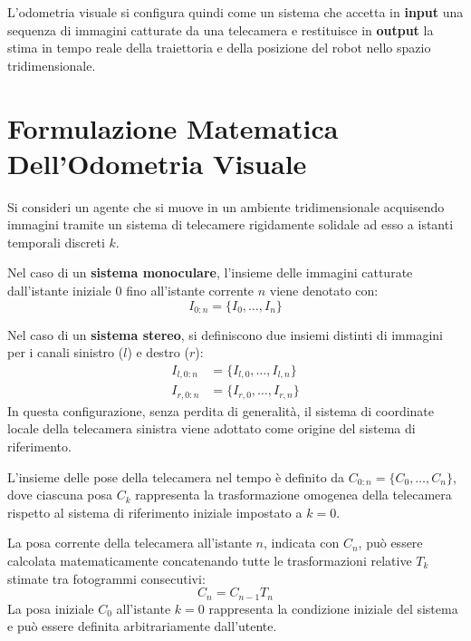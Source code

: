 ﻿\documentclass[11pt, a4paper]{article}
\begin{document}
L'odometria visuale si configura quindi come un sistema che accetta in \textbf{input} una sequenza di immagini catturate da una telecamera e restituisce in \textbf{output} la stima in tempo reale della traiettoria e della posizione del robot nello spazio tridimensionale.


\newpage

\section{Formulazione Matematica Dell'Odometria Visuale}

Si consideri un agente che si muove in un ambiente tridimensionale acquisendo immagini tramite un sistema di telecamere rigidamente solidale ad esso a istanti temporali discreti $k$.

Nel caso di un \textbf{sistema monoculare}, l'insieme delle immagini catturate dall'istante iniziale $0$ fino all'istante corrente $n$ viene denotato con:
\[ I_{0:n} = \{I_0, \dots, I_n\} \]

Nel caso di un \textbf{sistema stereo}, si definiscono due insiemi distinti di immagini per i canali sinistro ($l$) e destro ($r$):
\begin{align*}
I_{l,0:n} &= \{I_{l,0}, \dots, I_{l,n}\} \\
I_{r,0:n} &= \{I_{r,0}, \dots, I_{r,n}\}
\end{align*}
In questa configurazione, senza perdita di generalità, il sistema di coordinate locale della telecamera sinistra viene adottato come origine del sistema di riferimento.


L'insieme delle pose della telecamera nel tempo è definito da $C_{0:n} = \{C_0, \dots, C_n\}$, dove ciascuna posa $C_k$ rappresenta la trasformazione omogenea della telecamera rispetto al sistema di riferimento iniziale impostato a $k=0$.


La posa corrente della telecamera all'istante $n$, indicata con $C_n$, può essere calcolata matematicamente concatenando tutte le trasformazioni relative $T_k$ stimate tra fotogrammi consecutivi:
\[ \boxed{C_n = C_{n-1} T_n} \]
La posa iniziale $C_0$ all'istante $k=0$ rappresenta la condizione iniziale del sistema e può essere definita arbitrariamente dall'utente.
\end{document}
